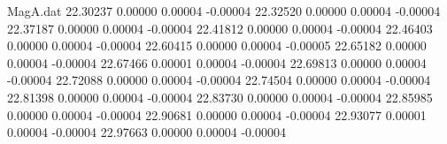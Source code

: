 \begin{filecontents}{MagA.dat}
  22.30237    0.00000    0.00004   -0.00004
  22.32520    0.00000    0.00004   -0.00004
  22.37187    0.00000    0.00004   -0.00004
  22.41812    0.00000    0.00004   -0.00004
  22.46403    0.00000    0.00004   -0.00004
  22.60415    0.00000    0.00004   -0.00005
  22.65182    0.00000    0.00004   -0.00004
  22.67466    0.00001    0.00004   -0.00004
  22.69813    0.00000    0.00004   -0.00004
  22.72088    0.00000    0.00004   -0.00004
  22.74504    0.00000    0.00004   -0.00004
  22.81398    0.00000    0.00004   -0.00004
  22.83730    0.00000    0.00004   -0.00004
  22.85985    0.00000    0.00004   -0.00004
  22.90681    0.00000    0.00004   -0.00004
  22.93077    0.00001    0.00004   -0.00004
  22.97663    0.00000    0.00004   -0.00004
\end{filecontents}
